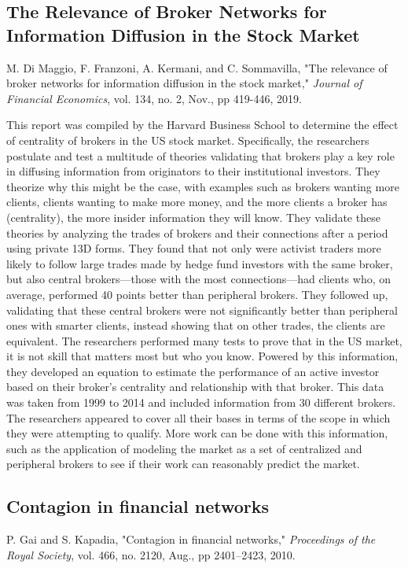 \documentclass[12pt]{article}
\begin{document}
\subsection{The Relevance of Broker Networks for Information Diffusion in the Stock Market}
M. Di Maggio, F. Franzoni, A. Kermani, and C. Sommavilla, "The relevance of broker networks for information diffusion in the stock market," \textit{Journal of Financial Economics}, vol. 134, no. 2, Nov., pp 419-446, 2019. %
\newline

This report was compiled by the Harvard Business School to determine the effect of centrality of brokers in the US stock market. Specifically, the researchers postulate and test a multitude of theories validating that brokers play a key role in diffusing information from originators to their institutional investors. They theorize why this might be the case, with examples such as brokers wanting more clients, clients wanting to make more money, and the more clients a broker has (centrality), the more insider information they will know. They validate these theories by analyzing the trades of brokers and their connections after a period using private 13D forms. They found that not only were activist traders more likely to follow large trades made by hedge fund investors with the same broker, but also central brokers—those with the most connections—had clients who, on average, performed 40 points better than peripheral brokers. They followed up, validating that these central brokers were not significantly better than peripheral ones with smarter clients, instead showing that on other trades, the clients are equivalent. The researchers performed many tests to prove that in the US market, it is not skill that matters most but who you know. Powered by this information, they developed an equation to estimate the performance of an active investor based on their broker’s centrality and relationship with that broker. This data was taken from 1999 to 2014 and included information from 30 different brokers. The researchers appeared to cover all their bases in terms of the scope in which they were attempting to qualify. More work can be done with this information, such as the application of modeling the market as a set of centralized and peripheral brokers to see if their work can reasonably predict the market.


\subsection{Contagion in financial networks}
P. Gai and S. Kapadia, "Contagion in financial networks," \textit{Proceedings of the Royal Society}, vol. 466, no. 2120, Aug., pp 2401–2423, 2010.
\newline
\end{document}
